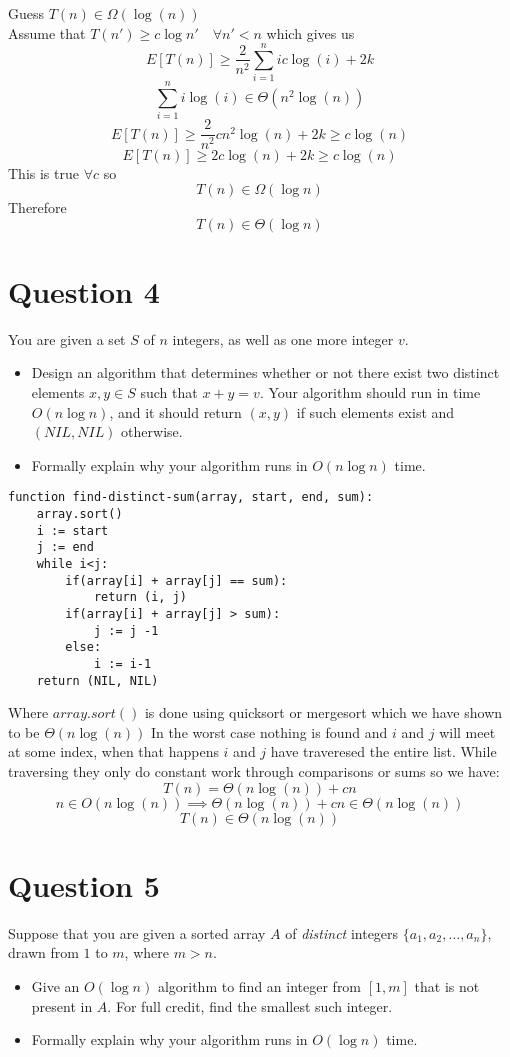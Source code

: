 \documentclass{article}
\begin{document}
Guess $T(n) \in \Omega(\log(n)) $ \\
Assume that $T(n') \geq c\log{n'} \quad \forall n' < n$ which gives us
$$ E [T(n)] \geq \frac{2}{n^2}\sum_{i=1}^{n}ic\log(i) + 2k $$
$$ \sum_{i=1}^{n}i\log(i) \in \Theta(n^2\log(n)) $$
$$ E [T(n)] \geq \frac{2}{n^2}cn^2\log(n) + 2k \geq c\log(n)$$
$$ E [T(n)] \geq 2c\log(n) + 2k \geq c\log(n)$$
This is true $\forall c$ so
$$ T(n) \in \Omega(\log{n})$$
Therefore
$$ T(n) \in \Theta(\log{n}) $$

\section*{Question 4}
You are given a set $S$ of $n$ integers, as well as one more integer $v$.
\begin{itemize}
\item Design an algorithm that
determines whether or not there exist two distinct elements $x,y\in S$ such that $x+y=v$. Your algorithm
should run in time $O(n\log n)$, and it should return $(x,y)$ if such elements exist and $(NIL, NIL)$ otherwise.
\item Formally explain why your algorithm runs in $O(n\log n)$ time.
\end{itemize}

\begin{lstlisting}
function find-distinct-sum(array, start, end, sum):
    array.sort()
    i := start
    j := end
    while i<j:
        if(array[i] + array[j] == sum):
            return (i, j)
        if(array[i] + array[j] > sum):
            j := j -1
        else:
            i := i-1
    return (NIL, NIL)
\end{lstlisting}
Where $array.sort()$ is done using quicksort or mergesort which we have shown to be $\Theta(n\log(n))$
In the worst case nothing is found and $i$ and $j$ will meet at some index, when that happens $i$ and $j$ have traveresed the entire list.
While traversing they only do constant work through comparisons or sums so we have:
$$ T(n) = \Theta(n\log(n)) + cn $$
$$ n \in O(n\log(n)) \implies \Theta(n\log(n)) + cn \in \Theta(n\log(n))$$
$$ T(n) \in \Theta(n\log(n)) $$


\section*{Question 5}
Suppose that you are given a sorted array $A$ of {\em distinct} integers $\{a_1, a_2,\dots, a_n\}$,
drawn from $1$ to $m$, where $m>n$.
\begin{itemize}
\item Give an $O(\log n)$ algorithm to find an integer from $[1, m]$ that is not
present in $A$. For full credit, find the smallest such integer.
\item Formally explain why your algorithm runs in $O(\log n)$ time.
\end{itemize}
\end{document}
